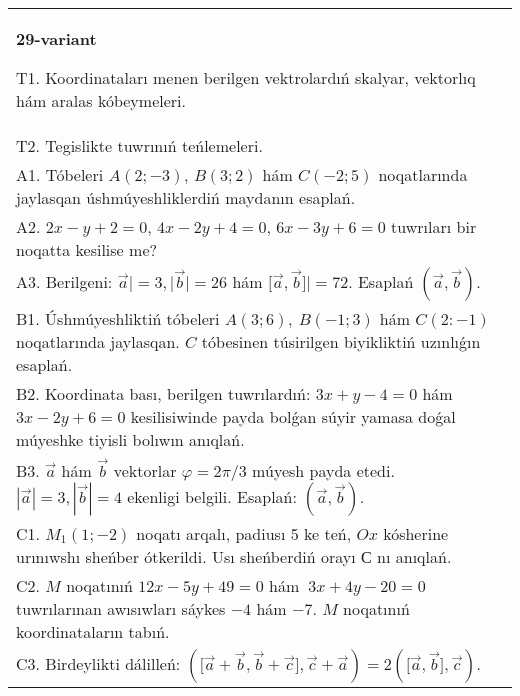 \documentclass{article}
\begin{document}
\begin{tabular}{m{17cm}}
\textbf{29-variant}
\newline

T1. 
Koordinataları menen berilgen vektrolardıń skalyar, vektorlıq hám aralas kóbeymeleri. \\
T2. 
Tegislikte tuwrınıń teńlemeleri.
 \\
A1. 
Tóbeleri $A(2;-3)$, $B(3;2)$ hám $C(-2;5)$ 
noqatlarında jaylasqan úshmúyeshliklerdiń maydanın esaplań.
 \\
A2. 
$2x-y+2=0$, $4x-2y+4=0$, $6x-3y+6=0$ 
tuwrıları bir noqatta kesilise me?
 \\
A3. 
Berilgeni: $\overrightarrow{a}| = 3,|\overrightarrow{b}| = 26$ hám
$\lbrack\overrightarrow{a},\overrightarrow{b}\rbrack| = 72$. Esaplań
$\left(\overrightarrow{a},\overrightarrow{b} \right) $.
 \\
B1. 
Úshmúyeshliktiń tóbeleri \(A(3;6),\ B(-1;3)\) hám
\(C(2:-1)\) noqatlarında jaylasqan. $C$ tóbesinen túsirilgen biyikliktiń uzınlıǵın esaplań.
 \\
B2. 
Koordinata bası, berilgen tuwrılardıń:
\(3x+y-4=0\) hám \(3x-2y+6=0\) kesilisiwinde payda
bolǵan súyir yamasa doǵal múyeshke tiyisli bolıwın anıqlań.
 \\
B3. 
$\vec{a}$ hám $\vec{b}$ vektorlar $\varphi = 2\pi/3$ múyesh payda etedi. $|\vec{a}| = 3,|\vec{b}| = 4$ ekenligi belgili. Esaplań: 
$\left(\vec{a},\vec{b} \right)$.
 \\
C1. 
\(M_{1}(1; - 2)\) noqatı arqalı, padiusı 5 ke teń,
$Ox$ kósherine urınıwshı sheńber ótkerildi. Usı sheńberdiń orayı
$С$ nı anıqlań.
 \\
C2. 
$M$ noqatınıń \(12x - 5y + 49 = 0\) hám
\(\ 3x + 4y - 20 = 0\) tuwrılarınan awısıwları sáykes $-4$ hám
$-7$. $M$ noqatınıń koordinataların tabıń.
 \\
C3. 
Birdeylikti dálilleń: \((\lbrack\vec{a} + \vec{b},\vec{b} + \vec{c}\rbrack,\vec{c} + \vec{a}) = 2 (\lbrack\vec{a},\vec{b}\rbrack,\vec{c}) \).
 \\

\end{tabular}
\vspace{1cm}
\end{document}
